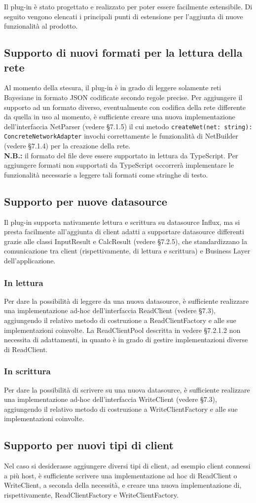 Il plug-in è stato progettato e realizzato per poter essere facilmente estensibile. Di seguito vengono elencati i principali punti di estensione per l'aggiunta di nuove funzionalità al prodotto.
\subsection{Supporto di nuovi formati per la lettura della rete}
Al momento della stesura, il plug-in è in grado di leggere solamente reti Bayesiane in formato JSON codificate secondo regole precise. Per aggiungere il supporto ad un formato diverso, eventualmente con codifica della rete differente da quella in uso al momento, è sufficiente creare una nuova implementazione dell'interfaccia NetParser (vedere §7.1.5) il cui metodo \texttt{createNet(net: string): ConcreteNetworkAdapter} invochi correttamente le funzionalità di NetBuilder (vedere §7.1.4) per la creazione della rete.\\
\textbf{N.B.:} il formato del file deve essere supportato in lettura da TypeScript. Per aggiungere formati non supportati da TypeScript occorrerà implementare le funzionalità necessarie a leggere tali formati come stringhe di testo.
\subsection{Supporto per nuove datasource}
Il plug-in supporta nativamente lettura e scrittura su datasource Influx, ma si presta facilmente all'aggiunta di client adatti a supportare datasource differenti grazie alle classi InputResult e CalcResult (vedere §7.2.5), che standardizzano la comunicazione tra client (rispettivamente, di lettura e scrittura) e Business Layer dell'applicazione.
\subsubsection{In lettura}
Per dare la possibilità di leggere da una nuova datasource, è sufficiente realizzare una implementazione ad-hoc dell'interfaccia ReadClient (vedere §7.3), aggiungendo il relativo metodo di costruzione a ReadClientFactory e alle sue implementazioni coinvolte. La ReadClientPool descritta in vedere §7.2.1.2 non necessita di adattamenti, in quanto è in grado di gestire implementazioni diverse di ReadClient.
\subsubsection{In scrittura}
Per dare la possibilità di scrivere su una nuova datasource, è sufficiente realizzare una implementazione ad-hoc dell'interfaccia WriteClient (vedere §7.3), aggiungendo il relativo metodo di costruzione a WriteClientFactory e alle sue implementazioni coinvolte.
\subsection{Supporto per nuovi tipi di client}
Nel caso si desiderasse aggiungere diversi tipi di client, ad esempio client connessi a più host, è sufficiente scrivere una implementazione ad hoc di ReadClient o WriteClient, a seconda della necessità, e creare una nuova implementazione di, rispettivamente, ReadClientFactory e WriteClientFactory.